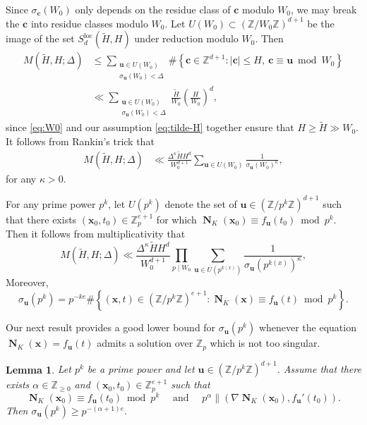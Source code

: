 \documentclass[11pt,letterpaper]{amsart}
\renewcommand{\leq}{\leqslant}
\renewcommand{\geq}{\geqslant}
\newtheorem{lemma}[theorem]{Lemma}
\theoremstyle{definition}
\numberwithin{equation}{section}
\newcommand\ZZ{\mathbb{Z}}
\newcommand{\x}{\mathbf{x}}
\renewcommand{\c}{\mathbf{c}}
\renewcommand{\u}{\mathbf{u}}
\DeclareMathOperator{\nf}{\mathbf{N}}
\newcommand{\0}{\mathbf{0}}
\begin{document}
Since 
$\sigma_\c(W_0)$ only depends on the 
residue class of $\c$ modulo $W_0$, we may break  the $\c$ into residue classes modulo $W_0$.
Let $U(W_0)\subset (\ZZ/W_0\ZZ)^{d+1}$ be the 
image of the set $S_d^{\text{loc}}(\tilde H, H)$ under reduction modulo $W_0$. 
Then 
\begin{align*}
M(\tilde H,H;\Delta)
&\leq
\sum_{
\substack{ 
 \u\in U(W_0) \\ 
 \sigma_\u(W_0) <\Delta}} \#\left\{\c\in \ZZ^{d+1}: |\c|\leq H, ~\c\equiv \u\bmod{W_0}
\right\}\\
&\ll
\sum_{
\substack{ 
 \u\in U(W_0) \\ 
 \sigma_\u(W_0) <\Delta}}\frac{\tilde H}{W_0} \left(\frac{H}{W_0}\right)^{d},
\end{align*} 
since 
\eqref{eq:W0} 
and our assumption
\eqref{eq:tilde-H} 
together ensure that 
$H\geq \tilde H \gg W_0$.
It follows from Rankin's trick that 
\begin{align*}
M(\tilde H,H;\Delta)
&\ll\frac{\Delta^{\kappa}\tilde H H^d}{W_0^{d+1} }
\sum_{\u\in U(W_0)} \frac{1}{ \sigma_\u(W_0)^{\kappa}},
\end{align*}
for any $\kappa>0$.

For any prime power $p^k$, let  $U(p^k)$ denote the set of 
$\u\in (\ZZ/p^k\ZZ)^{d+1}$ such that there 
exists  $(\x_0,t_0)\in \ZZ_p^{e+1}$ for which $\nf_K(\x_0)\equiv f_\u(t_0) \bmod{p^k}$.
Then 
it follows from multiplicativity that 
\begin{equation}\label{eq:st-post}
M(\tilde H,H;\Delta)
\ll\frac{\Delta^{\kappa}\tilde H H^d}{W_0^{d+1} }
\prod_{p\mid W_0}
\sum_{\u\in U(p^{k(x)})} \frac{1}{ \sigma_\u(p^{k(x)})^{\kappa}},
\end{equation}
Moreover, 
$$
\sigma_\u(p^k)=p^{-ke}\#\left\{
(\x,t)\in (\ZZ/p^k\ZZ)^{e+1}: \nf_K(\x)\equiv f_\u(t)\bmod{p^k}
\right\}.
$$

Our next result provides a good lower bound for 
$\sigma_\u(p^k)$ whenever  the equation $\nf_K(\x)=f_\u(t)$ admits a solution over $\ZZ_p$ which is not too singular. 

\begin{lemma}\label{lem:0.3}
Let $p^k$ be a prime power and let 
  $\u\in (\ZZ/p^k\ZZ)^{d+1}$.
Assume that there exists 
$\alpha\in \ZZ_{\geq 0}$ and 
$ (\x_0,t_0)\in \ZZ_p^{e+1}$ such that 
\begin{equation}\label{eq:goat}
\nf_K(\x_0)\equiv f_\u(t_0) \bmod{p^k}\quad \text{ and }\quad
p^\alpha\| (\nabla \nf_K(\x_0), f_\u'(t_0)).
\end{equation}
Then
$
\sigma_\u(p^k)\geq p^{-(\alpha+1)e}.
$
\end{lemma}
\end{document}
